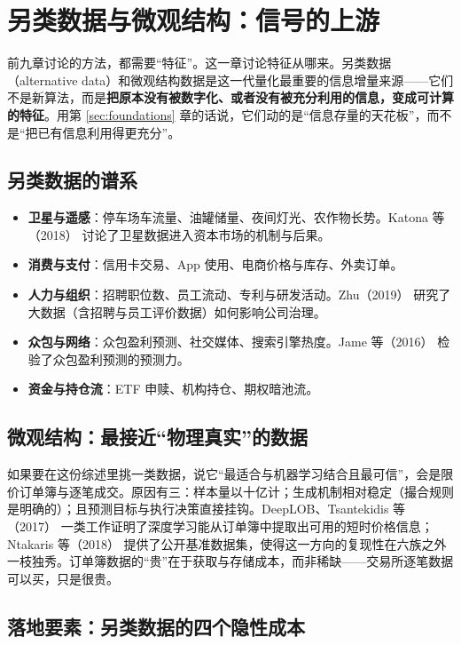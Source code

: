 \section{另类数据与微观结构：信号的上游}\label{sec:altdata}

前九章讨论的方法，都需要“特征”。这一章讨论特征从哪来。另类数据（alternative data）和微观结构数据是这一代量化最重要的信息增量来源——它们不是新算法，而是\textbf{把原本没有被数字化、或者没有被充分利用的信息，变成可计算的特征}。用第 \ref{sec:foundations} 章的话说，它们动的是“信息存量的天花板”，而不是“把已有信息利用得更充分”。

\subsection{另类数据的谱系}

\begin{itemize}
  \item \textbf{卫星与遥感}：停车场车流量、油罐储量、夜间灯光、农作物长势。Katona 等（2018）\cite{katona2018} 讨论了卫星数据进入资本市场的机制与后果。
  \item \textbf{消费与支付}：信用卡交易、App 使用、电商价格与库存、外卖订单。
  \item \textbf{人力与组织}：招聘职位数、员工流动、专利与研发活动。Zhu（2019）\cite{zhu2019} 研究了大数据（含招聘与员工评价数据）如何影响公司治理。
  \item \textbf{众包与网络}：众包盈利预测、社交媒体、搜索引擎热度。Jame 等（2016）\cite{jame2016} 检验了众包盈利预测的预测力。
  \item \textbf{资金与持仓流}：ETF 申赎、机构持仓、期权暗池流。
\end{itemize}

\subsection{微观结构：最接近“物理真实”的数据}

如果要在这份综述里挑一类数据，说它“最适合与机器学习结合且最可信”，会是限价订单簿与逐笔成交。原因有三：样本量以十亿计；生成机制相对稳定（撮合规则是明确的）；且预测目标与执行决策直接挂钩。DeepLOB\cite{zhang2019deeplob}、Tsantekidis 等（2017）\cite{tsantekidis2017} 一类工作证明了深度学习能从订单簿中提取出可用的短时价格信息；Ntakaris 等（2018）\cite{ntakaris2018fi2010} 提供了公开基准数据集，使得这一方向的复现性在六族之外一枝独秀。订单簿数据的“贵”在于获取与存储成本，而非稀缺——交易所逐笔数据可以买，只是很贵。

\subsection{落地要素：另类数据的四个隐性成本}

